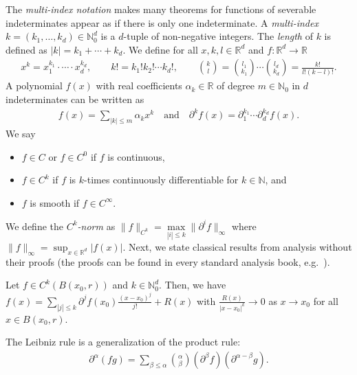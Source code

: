 The \emph{multi-index notation} makes many theorems for functions of severable indeterminates appear as if there is only one indeterminate. A \emph{multi-index} \(k = (k_1, \ldots ,k_d) \in \mathbb{N}^d_0\) is a \(d\)-tuple of non-negative integers. The \emph{length} of \(k\) is defined as \(|k| = k_1 + \cdots + k_d\). We define for all \(x, k,l \in \mathbb{R}^d\) and \(f: \mathbb{R}^d \to \mathbb{R}\)
\begin{gather*}
    x^k = x_1^{k_1} \cdot \cdots \cdot x_d^{k_d}, \qquad
    k! = k_1! k_2! \cdots k_d!, \qquad
    \binom{k}{l} = \binom{l_1}{k_1} \cdots \binom{l_d}{k_d} = \frac{k!}{l! (k - l)!}.
\end{gather*}
A polynomial \(f(x)\) with real coefficients \(\alpha_k \in \mathbb{R}\) of degree \(m \in \mathbb{N}_0\) in \(d\) indeterminates can be written as 
\begin{align*}
    f(x) = \sum\limits_{|k| \leq m} \alpha_{k}x^k  \quad \text{and} \quad
    \partial^k f(x) = \partial^{k_1}_{1} \cdots \partial^{k_d}_{d} f(x).
\end{align*}
We say 
\begin{itemize}
    \item \(f \in C\) or \(f \in C^0\) if \(f\) is continuous,
    \item \(f \in C^k\) if \(f\) is {\(k\)-times continuously differentiable} for \(k \in \mathbb{N}\), and
    \item \(f\) is {smooth} if \( f \in C^\infty \).
\end{itemize}
We define the \emph{\(C^k\)-norm} as \(\lVert f \rVert_{C^k} = \max\limits_{|i| \leq k} \lVert \partial^i f \rVert_{\infty}\) where \(\lVert f \rVert_{\infty} = \sup_{x \in \mathbb{R}^d} |f(x)|\). Next, we state classical results from analysis without their proofs (the proofs can be found in every standard analysis book, e.g.~\cite{MR0055409}).
\begin{theorem}
    Let \(f \in C^{k}(B(x_0, r))\) and \(k \in \mathbb{N}^d_0\). Then, we have \(f(x) = \sum\limits_{|j| \leq k}\partial^{j} f(x_0) \frac{{(x-x_0)}^j}{j!} + R(x)\) with \(\frac{R(x)}{|x-x_0|^{k}} \to 0\) as \(x \to x_0\) for all \(x \in B(x_0, r)\).
\end{theorem}

\begin{theorem}\label{theorem:leibniz}
    The Leibniz rule is a generalization of the product rule:
    \begin{align*}
        \partial^\alpha(fg) = \sum_{\beta \leq \alpha} \binom{\alpha}{\beta} (\partial^\beta f) (\partial^{\alpha - \beta} g).
    \end{align*}
\end{theorem}

